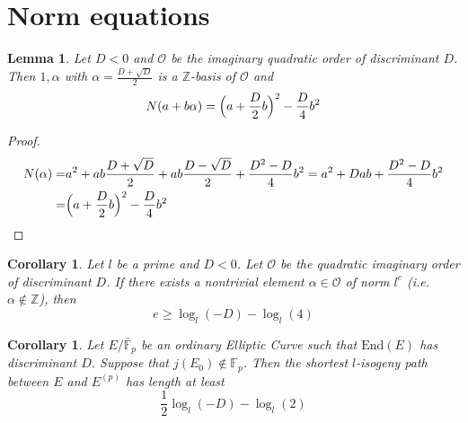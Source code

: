 \documentclass{scrartcl}
\newcommand{\Z}{\mathbb{Z}}
\newcommand{\F}{\mathbb{F}}
\newcommand{\End}{\mathrm{End}}
\renewcommand{\O}{\mathcal{O}}
\newtheorem{lemma}[prop]{Lemma}
\newtheorem{corollary}[prop]{Corollary}
\theoremstyle{definition}
\begin{document}
\section{Norm equations}
\begin{lemma}
    Let $D < 0$ and $\O$ be the imaginary quadratic order of discriminant $D$.
    Then $1, \alpha$ with $\alpha = \frac {D + \sqrt{D}} 2$ is a $\Z$-basis of $\O$ and
    \begin{equation*}
        N(a + b\alpha) = \Bigl(a + \frac D 2 b\Bigr)^2 - \frac D 4 b^2
    \end{equation*}
\end{lemma}
\begin{proof}
    \begin{align*}
        N(\alpha) =& a^2 + ab \frac {D + \sqrt{D}} 2 + ab \frac {D - \sqrt{D}} 2 + \frac {D^2 - D} 4 b^2 = a^2 + Dab + \frac {D^2 - D} 4 b^2 \\
        =& \Bigl(a + \frac D 2 b\Bigr)^2 - \frac D 4 b^2
    \end{align*}
\end{proof}
\begin{corollary}
    Let $l$ be a prime and $D < 0$.
    Let $\O$ be the quadratic imaginary order of discriminant $D$.
    If there exists a nontrivial element $\alpha \in \O$ of norm $l^e$ (i.e. $\alpha \notin \Z$), then
    \begin{equation*}
        e \geq \log_l(-D) - \log_l(4)
    \end{equation*} 
\end{corollary}
\begin{corollary}
    Let $E/\bar{\F}_p$ be an ordinary Elliptic Curve such that $\End(E)$ has discriminant $D$.
    Suppose that $j(E_0) \notin \F_p$.
    Then the shortest $l$-isogeny path between $E$ and $E^{(p)}$ has length at least
    \begin{equation*}
        \frac 1 2 \log_l(-D) - \log_l(2)
    \end{equation*}
\end{corollary}
\end{document}
